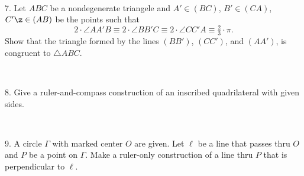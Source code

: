 \documentclass[oneside,a4paper]{article}
\begin{document}
\ 

\noi %
{7.} Let $ABC$ be a nondegenerate triangele and $A'\in (BC)$, $B'\in (CA)$, $C'\z\in (AB)$ be the points such that 
\[2\cdot \angle AA'B\equiv 2\cdot \angle BB'C\equiv 2\cdot \angle CC'A\equiv \tfrac23{\cdot}\pi.\]
Show that the triangle formed by the lines $(BB')$, $(CC')$, and $(AA')$, is congruent to  $\triangle ABC$.

\ 

\noi %
{8.} Give a ruler-and-compass construction of an inscribed quadrilateral with given sides.

\ 

\noi %
{9.} A circle $\Gamma$ with marked center $O$ are given.
Let $\ell$ be a line that passes thru $O$ and $P$ be a point on $\Gamma$.
Make a ruler-only construction of a line thru $P$ that is perpendicular to $\ell$.
\end{document}
